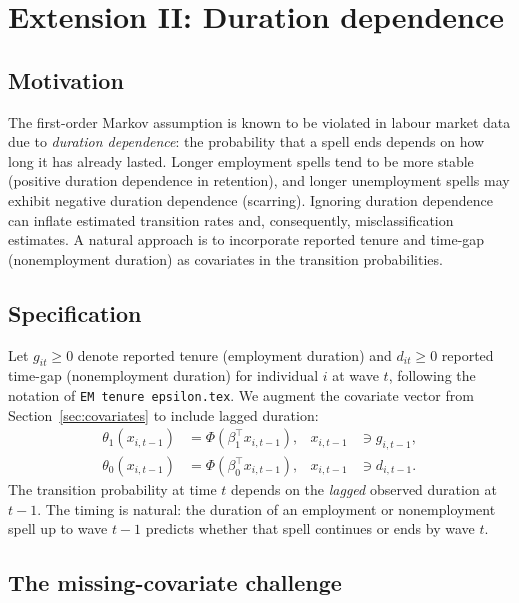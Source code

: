 \documentclass[12pt]{article}
\begin{document}
\section{Extension II: Duration dependence}
\label{sec:duration_cov}

\subsection{Motivation}

The first-order Markov assumption is known to be violated in labour
market data due to \emph{duration dependence}: the probability that a
spell ends depends on how long it has already lasted. Longer employment
spells tend to be more stable (positive duration dependence in retention),
and longer unemployment spells may exhibit negative duration dependence
(scarring). Ignoring duration dependence can inflate estimated transition
rates and, consequently, misclassification estimates. A natural approach
is to incorporate reported tenure and time-gap (nonemployment duration)
as covariates in the transition probabilities.

\subsection{Specification}

Let \(g_{it} \ge 0\) denote reported tenure (employment duration) and
\(d_{it} \ge 0\) reported time-gap (nonemployment duration) for individual
\(i\) at wave \(t\), following the notation of \texttt{EM tenure epsilon.tex}.
We augment the covariate vector from
Section~\ref{sec:covariates} to include lagged duration:
\begin{align}
\theta_1(x_{i,t-1}) &= \Phi(\beta_1^\top x_{i,t-1}),
  & x_{i,t-1} &\ni g_{i,t-1},
  \label{eq:theta1_dur} \\
\theta_0(x_{i,t-1}) &= \Phi(\beta_0^\top x_{i,t-1}),
  & x_{i,t-1} &\ni d_{i,t-1}.
  \label{eq:theta0_dur}
\end{align}
The transition probability at time \(t\) depends on the \emph{lagged}
observed duration at \(t-1\). The timing is natural: the duration of
an employment or nonemployment spell up to wave \(t-1\) predicts
whether that spell continues or ends by wave \(t\).

\subsection{The missing-covariate challenge}
\label{sec:missing_cov}
\end{document}
